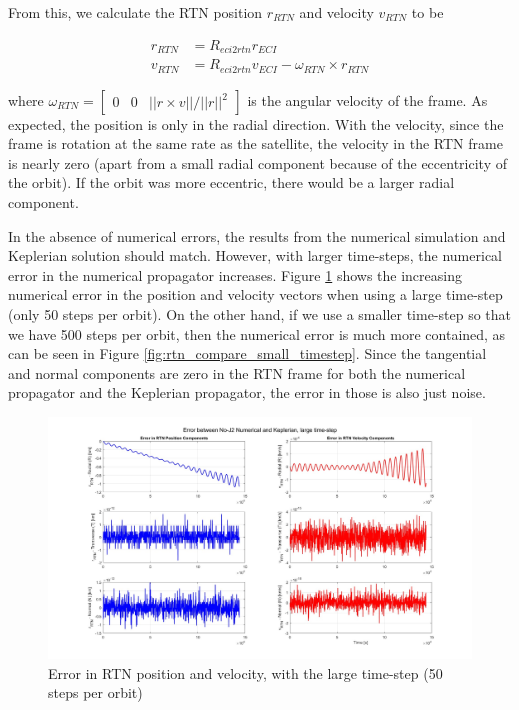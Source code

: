 From this, we calculate the RTN position $r_{RTN}$ and velocity $v_{RTN}$ to be

\begin{align*}
    r_{RTN} &= R_{eci2rtn} r_{ECI} \\
    v_{RTN} &= R_{eci2rtn} v_{ECI} - \omega_{RTN} \times r_{RTN}
\end{align*}

where $\omega_{RTN} = \begin{bmatrix}
    0 & 0 & ||r\times v ||/||r||^2
\end{bmatrix}$ is the angular velocity of the frame. As expected, the position is only in the radial direction. With the velocity, since the frame is rotation at the same rate as the satellite, the velocity in the RTN frame is nearly zero (apart from a small radial component because of the eccentricity of the orbit). If the orbit was more eccentric, there would be a larger radial component.

In the absence of numerical errors, the results from the numerical simulation and Keplerian solution should match. However, with larger time-steps, the numerical error in the numerical propagator increases. Figure \ref{fig:rtn_compare_large_timestep} shows the increasing numerical error in the position and velocity vectors when using a large time-step (only 50 steps per orbit). On the other hand, if we use a smaller time-step so that we have 500 steps per orbit, then the numerical error is much more contained, as can be seen in Figure \ref{fig:rtn_compare_small_timestep}. Since the tangential and normal components are zero in the RTN frame for both the numerical propagator and the Keplerian propagator, the error in those is also just noise.

\begin{figure}[H]
    \centering
    \includegraphics[width=0.75\linewidth]{PS1/Figures/comparing_rtn_large_timestep.jpg}
    \caption{Error in RTN position and velocity, with the large time-step (50 steps per orbit)}
    \label{fig:rtn_compare_large_timestep}
\end{figure}

